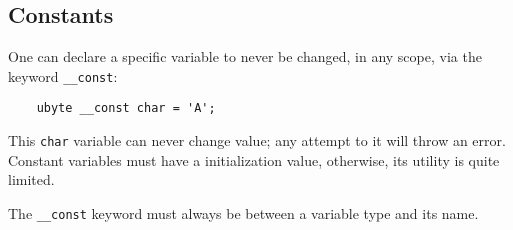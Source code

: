 \subsection{Constants} \label{const}

One can declare a specific variable to never be changed, in any scope,
via the keyword \texttt{\_\_const}:
\begin{lstlisting}
    ubyte __const char = 'A';
\end{lstlisting}
This \texttt{char} variable can never change value; any attempt to it
will throw an error.
Constant variables must have a initialization value, otherwise, its
utility is quite limited.

The \texttt{\_\_const} keyword must always be between a variable
type and its name.
